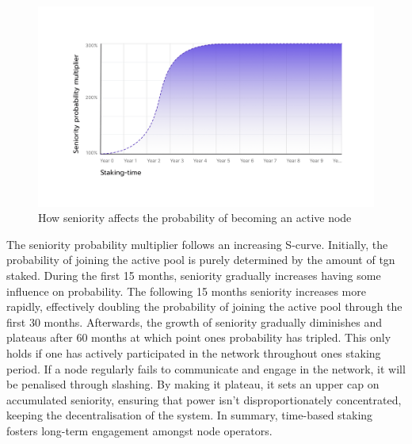    \begin{figure}[H]
	   \centering
	   \includegraphics[width=1\textwidth]{figures/seniority.png}
	   \caption{How seniority affects the probability of becoming an active node}
	   \label{figure:seniority}
    \end{figure}
    
    The seniority probability multiplier follows an increasing S-curve. Initially, the probability of joining the active pool is purely determined by the amount of \gls{tgn} staked. During the first 15 months, seniority gradually increases having some influence on probability. The following 15 months seniority increases more rapidly, effectively doubling the probability of joining the active pool through the first 30 months. Afterwards, the growth of seniority gradually diminishes and plateaus after 60 months at which point ones probability has tripled. This only holds if one has actively participated in the network throughout ones staking period. If a node regularly fails to communicate and engage in the network, it will be penalised through slashing. By making it plateau, it sets an upper cap on accumulated seniority, ensuring that power isn't disproportionately concentrated, keeping the decentralisation of the system. In summary, time-based staking fosters long-term engagement amongst node operators.

